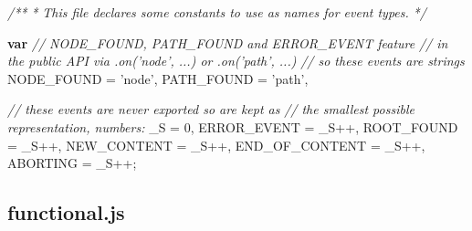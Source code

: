 \documentclass[]{article}
\newenvironment{Shaded}{}{}
\newcommand{\KeywordTok}[1]{\textcolor[rgb]{0.00,0.44,0.13}{\textbf{{#1}}}}
\newcommand{\DecValTok}[1]{\textcolor[rgb]{0.25,0.63,0.44}{{#1}}}
\newcommand{\StringTok}[1]{\textcolor[rgb]{0.25,0.44,0.63}{{#1}}}
\newcommand{\CommentTok}[1]{\textcolor[rgb]{0.38,0.63,0.69}{\textit{{#1}}}}
\newcommand{\NormalTok}[1]{{#1}}
\begin{document}
\begin{Shaded}
\begin{Highlighting}[]
\CommentTok{/**}
\CommentTok{ * This file declares some constants to use as names for event types.}
\CommentTok{ */}

\KeywordTok{var} \CommentTok{// NODE_FOUND, PATH_FOUND and ERROR_EVENT feature }
    \CommentTok{// in the public API via .on('node', ...) or .on('path', ...)}
    \CommentTok{// so these events are strings}
    \NormalTok{NODE_FOUND    = }\StringTok{'node'}\NormalTok{,  }
    \NormalTok{PATH_FOUND    = }\StringTok{'path'}\NormalTok{,   }
         
    \CommentTok{// these events are never exported so are kept as }
    \CommentTok{// the smallest possible representation, numbers:}
    \NormalTok{_S = }\DecValTok{0}\NormalTok{,}
    \NormalTok{ERROR_EVENT   = _S++,    }
    \NormalTok{ROOT_FOUND    = _S++,    }
    \NormalTok{NEW_CONTENT = _S++,}
    \NormalTok{END_OF_CONTENT = _S++,}
    \NormalTok{ABORTING = _S++;}
\end{Highlighting}
\end{Shaded}

\pagebreak

\subsection{functional.js}
\end{document}
